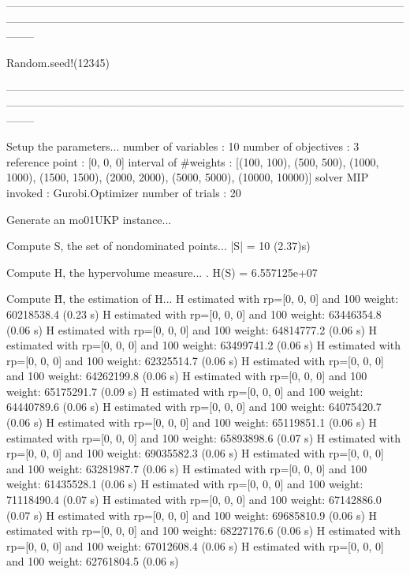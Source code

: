 --------------------------------------------------------------------------------------------------------------------------------------------------------------------------------------------------------------------------------

Random.seed!(12345)

--------------------------------------------------------------------------------------------------------------------------------------------------------------------------------------------------------------------------------

Setup the parameters...
  number of variables  : 10
  number of objectives : 3
  reference point      : [0, 0, 0]
  interval of #weights : [(100, 100), (500, 500), (1000, 1000), (1500, 1500), (2000, 2000), (5000, 5000), (10000, 10000)]
  solver MIP invoked   : Gurobi.Optimizer
  number of trials     : 20

Generate an mo01UKP instance...

Compute S, the set of nondominated points...
  |S|  = 10 (2.37)s)

Compute H, the hypervolume measure...
. H(S) = 6.557125e+07

Compute H̃, the estimation of H...
  H estimated with rp=[0, 0, 0] and 100 weight:  60218538.4  (0.23 s)
  H estimated with rp=[0, 0, 0] and 100 weight:  63446354.8  (0.06 s)
  H estimated with rp=[0, 0, 0] and 100 weight:  64814777.2  (0.06 s)
  H estimated with rp=[0, 0, 0] and 100 weight:  63499741.2  (0.06 s)
  H estimated with rp=[0, 0, 0] and 100 weight:  62325514.7  (0.06 s)
  H estimated with rp=[0, 0, 0] and 100 weight:  64262199.8  (0.06 s)
  H estimated with rp=[0, 0, 0] and 100 weight:  65175291.7  (0.09 s)
  H estimated with rp=[0, 0, 0] and 100 weight:  64440789.6  (0.06 s)
  H estimated with rp=[0, 0, 0] and 100 weight:  64075420.7  (0.06 s)
  H estimated with rp=[0, 0, 0] and 100 weight:  65119851.1  (0.06 s)
  H estimated with rp=[0, 0, 0] and 100 weight:  65893898.6  (0.07 s)
  H estimated with rp=[0, 0, 0] and 100 weight:  69035582.3  (0.06 s)
  H estimated with rp=[0, 0, 0] and 100 weight:  63281987.7  (0.06 s)
  H estimated with rp=[0, 0, 0] and 100 weight:  61435528.1  (0.06 s)
  H estimated with rp=[0, 0, 0] and 100 weight:  71118490.4  (0.07 s)
  H estimated with rp=[0, 0, 0] and 100 weight:  67142886.0  (0.07 s)
  H estimated with rp=[0, 0, 0] and 100 weight:  69685810.9  (0.06 s)
  H estimated with rp=[0, 0, 0] and 100 weight:  68227176.6  (0.06 s)
  H estimated with rp=[0, 0, 0] and 100 weight:  67012608.4  (0.06 s)
  H estimated with rp=[0, 0, 0] and 100 weight:  62761804.5  (0.06 s)

